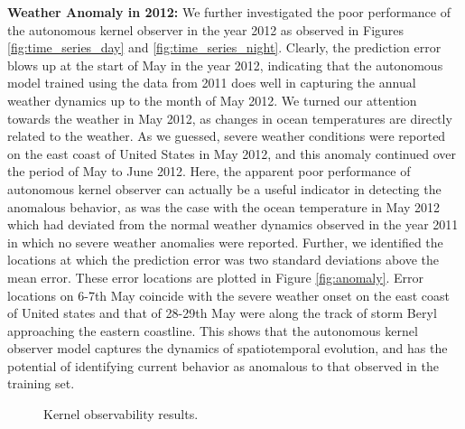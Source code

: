 \textbf{Weather Anomaly in 2012:} We further investigated the poor performance of the autonomous kernel observer in the year 2012 as observed in Figures \ref{fig:time_series_day} and \ref{fig:time_series_night}. Clearly, the prediction error blows up at the start of May in the year 2012, indicating that the autonomous model trained using the data from 2011 does well in capturing the annual weather dynamics up to the month of May 2012. We turned our attention towards the weather in May 2012, as changes in ocean temperatures are directly related to the weather. As we guessed, severe weather conditions were reported on the east coast of United States in May 2012, and this anomaly continued over the period of May to June 2012. Here, the apparent poor performance of autonomous kernel observer can actually be a useful indicator in detecting the anomalous behavior, as was the case with the ocean temperature in May 2012 which had deviated from the normal weather dynamics observed in the year 2011 in which no severe weather anomalies were reported. Further, we identified the locations at which the prediction error was two standard deviations above the mean error. These error locations are plotted in Figure \ref{fig:anomaly}. Error locations on 6-7th May coincide with the severe weather onset on the east coast of United states and that of 28-29th May were along the track of storm Beryl approaching the eastern coastline. This shows that the autonomous kernel observer model captures the dynamics of spatiotemporal evolution, and has the potential of identifying current behavior as anomalous to that observed in the training set.
 
 
\begin{figure}
\centering
    \caption{Kernel observability results.}
\end{figure} 


